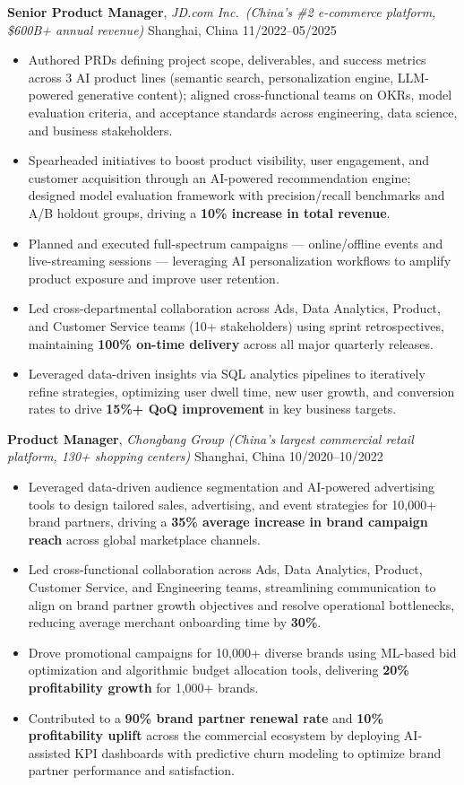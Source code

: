 \documentclass[10pt, letterpaper]{article}
\begin{document}
\textbf{Senior Product Manager}, \textit{JD.com Inc.\ (China's \#2 e-commerce platform, \$600B+ annual revenue)} \hfill Shanghai, China \textbar{} 11/2022--05/2025
\begin{itemize}
    \item Authored PRDs defining project scope, deliverables, and success metrics across 3 AI product lines (semantic search, personalization engine, LLM-powered generative content); aligned cross-functional teams on OKRs, model evaluation criteria, and acceptance standards across engineering, data science, and business stakeholders.
    \item Spearheaded initiatives to boost product visibility, user engagement, and customer acquisition through an AI-powered recommendation engine; designed model evaluation framework with precision/recall benchmarks and A/B holdout groups, driving a \textbf{10\% increase in total revenue}.
    \item Planned and executed full-spectrum campaigns --- online/offline events and live-streaming sessions --- leveraging AI personalization workflows to amplify product exposure and improve user retention.
    \item Led cross-departmental collaboration across Ads, Data Analytics, Product, and Customer Service teams (10+ stakeholders) using sprint retrospectives, maintaining \textbf{100\% on-time delivery} across all major quarterly releases.
    \item Leveraged data-driven insights via SQL analytics pipelines to iteratively refine strategies, optimizing user dwell time, new user growth, and conversion rates to drive \textbf{15\%+ QoQ improvement} in key business targets.
\end{itemize}

\smallskip

\textbf{Product Manager}, \textit{Chongbang Group (China's largest commercial retail platform, 130+ shopping centers)} \hfill Shanghai, China \textbar{} 10/2020--10/2022
\begin{itemize}
    \item Leveraged data-driven audience segmentation and AI-powered advertising tools to design tailored sales, advertising, and event strategies for 10,000+ brand partners, driving a \textbf{35\% average increase in brand campaign reach} across global marketplace channels.
    \item Led cross-functional collaboration across Ads, Data Analytics, Product, Customer Service, and Engineering teams, streamlining communication to align on brand partner growth objectives and resolve operational bottlenecks, reducing average merchant onboarding time by \textbf{30\%}.
    \item Drove promotional campaigns for 10,000+ diverse brands using ML-based bid optimization and algorithmic budget allocation tools, delivering \textbf{20\% profitability growth} for 1,000+ brands.
    \item Contributed to a \textbf{90\% brand partner renewal rate} and \textbf{10\% profitability uplift} across the commercial ecosystem by deploying AI-assisted KPI dashboards with predictive churn modeling to optimize brand partner performance and satisfaction.
\end{itemize}
\end{document}
